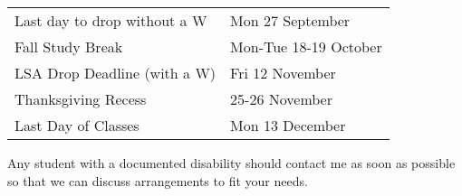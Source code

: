 \documentclass[11pt,twoside]{article}
\begin{document}
\begin{description}
\vspace{.1in}
\item [\bf Other Important dates:]

\smallskip
\begin{tabular}{ll}
Last day to drop without a W & Mon 27 September \\
Fall Study Break & Mon-Tue 18-19 October \\
LSA Drop Deadline (with a W) & Fri 12 November \\
Thanksgiving Recess & 25-26 November \\
Last Day of Classes & Mon 13 December
\end{tabular}

\vspace{.4in}
\item Any student with a documented disability should contact me as soon as possible so that we can discuss arrangements to fit your needs.
\end{description}
\end{document}
